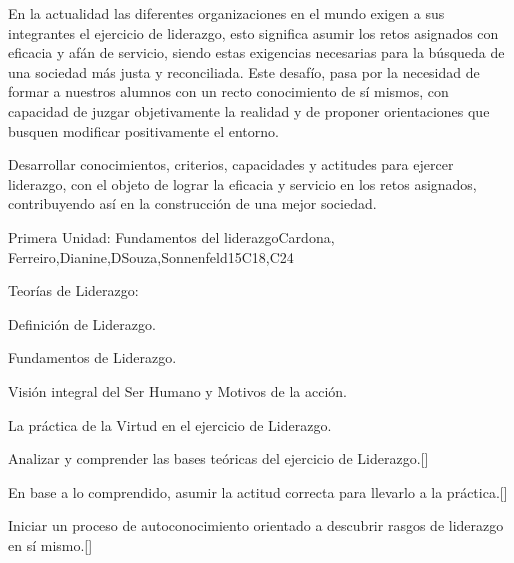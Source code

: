 \begin{syllabus}


\begin{justification}
En la actualidad las diferentes organizaciones en el mundo exigen a sus integrantes el ejercicio de liderazgo, esto significa asumir los retos asignados con eficacia y afán de servicio, siendo estas exigencias necesarias para la búsqueda de una sociedad más justa y reconciliada. 
Este desafío, pasa por la necesidad de formar a nuestros alumnos con un recto conocimiento de sí mismos, con capacidad de juzgar objetivamente la realidad y de proponer  orientaciones que busquen modificar positivamente el entorno.  \end{justification}

\begin{goals}
\item Desarrollar conocimientos, criterios, capacidades y actitudes para ejercer liderazgo, con el objeto de lograr la eficacia y servicio en los retos asignados, contribuyendo así en la construcción de una mejor sociedad.
\end{goals}

\begin{outcomes}
    \item {}
    \item {}
    \item {}
\end{outcomes}

\begin{competences}
    \item {}
    \item {}
    \item {}
\end{competences}

\begin{unit}{}{Primera Unidad: Fundamentos del liderazgo}{Cardona, Ferreiro,Dianine,DSouza,Sonnenfeld}{15}{C18,C24}
\begin{topics}
	
	\item Teorías de Liderazgo: 
	\item Definición de Liderazgo.
	\item Fundamentos de Liderazgo.
	\item Visión integral del Ser Humano y Motivos de la acción.
	\item La práctica de la Virtud en el ejercicio de Liderazgo.
\end{topics}
\begin{learningoutcomes}
	\item Analizar y comprender las bases teóricas del ejercicio de Liderazgo.[\Familiarity]
	\item En base a lo comprendido, asumir la actitud correcta para llevarlo a la práctica.[\Familiarity]
	\item Iniciar un proceso de autoconocimiento orientado a descubrir rasgos de liderazgo en sí mismo.[\Familiarity]
\end{learningoutcomes}
\end{unit}


\end{syllabus}
